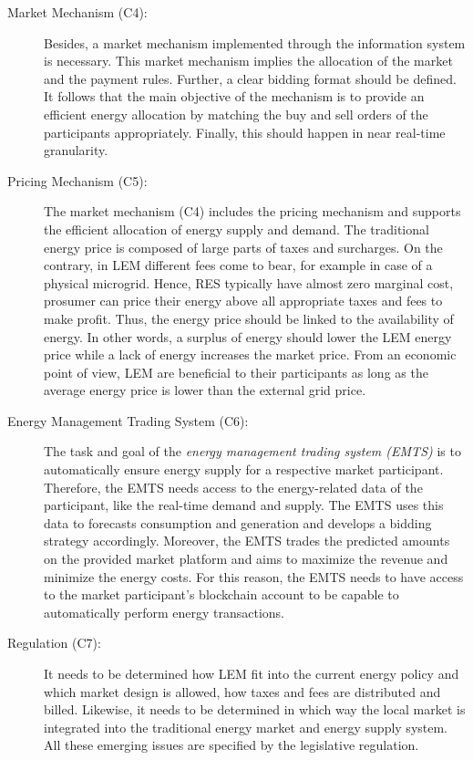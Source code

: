 \begin{description}
    \item[Market Mechanism (C4):] Besides, a market mechanism implemented through 
     the information system is necessary. This market mechanism implies the allocation of the
     market and the payment rules. Further, a clear bidding format should be defined. 
     It follows that the main objective of the mechanism is to provide an efficient
     energy allocation by matching the buy and sell orders of the participants appropriately.
     Finally, this should happen in near real-time granularity.    
    
    \item[Pricing Mechanism (C5):] The market mechanism (C4) includes the pricing mechanism 
     and supports the efficient allocation of energy supply and demand. 
     The traditional energy price is composed of large parts of taxes and surcharges.
     On the contrary, in LEM different fees come to bear, for example in case of a 
     physical microgrid. Hence, RES typically have almost zero marginal cost, prosumer can 
     price their energy above all appropriate taxes and fees to make profit. 
    Thus, the energy price should be linked to the availability of energy. In other words,
    a surplus of energy should lower the LEM energy price while a lack of energy increases the 
    market price. From an economic point of view, LEM are beneficial to their 
    participants as long as the average energy price is lower than the external grid price.
        
    \item[Energy Management Trading System (C6):] The task and goal of the \textit{energy management trading system (EMTS)}
     is to automatically ensure energy supply for a respective market participant.
     Therefore, the EMTS needs access to the energy-related data of the participant, like 
     the real-time demand and supply. The EMTS uses this data to forecasts consumption and
     generation and develops a bidding strategy accordingly. 
     Moreover, the EMTS trades the predicted amounts on the provided market platform 
     and aims to maximize the revenue and minimize the energy costs. 
     For this reason, the EMTS needs to have access to the market participant’s
     blockchain account to be capable to automatically perform energy transactions.

    \item[Regulation (C7):] It needs to be determined how LEM 
     fit into the current energy policy and which market design is allowed, how 
     taxes and fees are distributed and billed. Likewise, it needs to 
     be determined in which way the local market is integrated into the traditional
     energy market and energy supply system.
     All these emerging issues are specified by the legislative regulation.
    
\end{description}

\clearpage